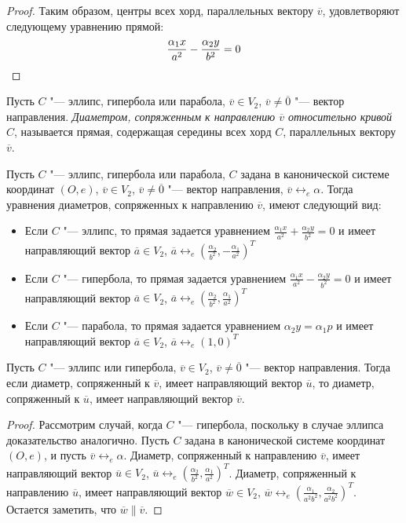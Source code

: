 {\begin{proof}
		Таким образом, центры всех хорд, параллельных вектору $\overline{v}$, удовлетворяют следующему уравнению прямой:
		\[\frac{\alpha_1 x}{a^2} - \frac{\alpha_2 y}{b^2} = 0\qedhere\]
	\end{proof}
	
	\begin{definition}
		Пусть $C$ "--- эллипс, гипербола или парабола, $\overline{v} \in V_2$, $\overline{v} \ne \overline 0$ "--- вектор направления. \textit{Диаметром, сопряженным к направлению $\overline{v}$ относительно кривой $C$}, называется прямая, содержащая середины всех хорд $C$, параллельных вектору $\overline{v}$.
	\end{definition}
	
	\begin{note}
		Пусть $C$ "--- эллипс, гипербола или парабола, $C$ задана в канонической системе координат $(O, e)$, $\overline{v} \in V_2$, $\overline{v} \ne \overline 0$ "--- вектор направления, $\overline{v} \leftrightarrow_{e} \alpha$. Тогда уравнения диаметров, сопряженных к направлению $\overline{v}$, имеют следующий вид:
		\begin{itemize}
			\item Если $C$ "--- эллипс, то прямая задается уравнением $\frac{\alpha_1 x}{a^2} + \frac{\alpha_2 y}{b^2} = 0$ и имеет направляющий вектор $\overline a \in V_2$, $\overline{a} \leftrightarrow_{e} (\frac{\alpha_2}{b^2}, -\frac{\alpha_1}{a^2})^T$
			\item Если $C$ "--- гипербола, то прямая задается уравнением $\frac{\alpha_1 x}{a^2} - \frac{\alpha_2 y}{b^2} = 0$ и имеет направляющий вектор $\overline a \in V_2$, $\overline{a} \leftrightarrow_{e} (\frac{\alpha_2}{b^2}, \frac{\alpha_1}{a^2})^T$
			\item Если $C$ "--- парабола, то прямая задается уравнением $\alpha_2 y = \alpha_1 p$ и имеет направляющий вектор $\overline a \in V_2$, $\overline{a} \leftrightarrow_{e} (1, 0)^T$
		\end{itemize}
	\end{note}
	
	\begin{proposition}
		Пусть $C$ "--- эллипс или гипербола, $\overline{v} \in V_2$, $\overline{v} \ne \overline 0$ "--- вектор направления. Тогда если диаметр, сопряженный к $\overline{v}$, имеет направляющий вектор $\overline{u}$, то диаметр, сопряженный к $\overline{u}$, имеет направляющий вектор $\overline{v}$.
	\end{proposition}
	
	\begin{proof}
		Рассмотрим случай, когда $C$ "--- гипербола, поскольку в случае эллипса доказательство аналогично. Пусть $C$ задана в канонической системе координат $(O, e)$, и пусть $\overline{v} \leftrightarrow_{e} \alpha$. Диаметр, сопряженный к направлению $\overline{v}$, имеет направляющий вектор $\overline{u} \in V_2$, $\overline u \leftrightarrow_{e} (\frac{\alpha_2}{b^2}, \frac{\alpha_1}{a^2})^T$. Диаметр, сопряженный к направлению $\overline{u}$, имеет направляющий вектор $\overline w \in V_2$, $\overline{w} \leftrightarrow_{e} (\frac{\alpha_1}{a^2b^2}, \frac{\alpha_2}{a^2b^2})^T$. Остается заметить, что $\overline{w} \parallel \overline{v}$.
	\end{proof}
	
}
